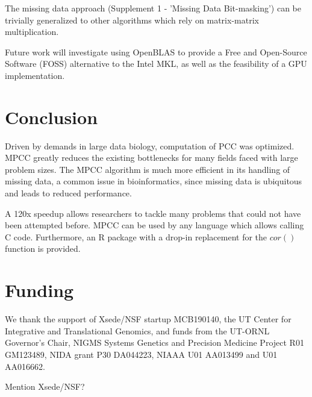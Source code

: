 \documentclass{bioinfo}
\begin{document}
The missing data approach (Supplement 1 - 'Missing Data Bit-masking')
can be trivially generalized to other algorithms which rely on
matrix-matrix multiplication.

Future work will investigate using OpenBLAS to provide a Free and
Open-Source Software (FOSS) alternative to the Intel\textregistered{}
MKL, as well as the feasibility of a GPU implementation.
\vspace*{-5mm}

\section{Conclusion}

Driven by demands in large data biology, computation of PCC was
optimized.  MPCC greatly reduces the existing bottlenecks for many
fields faced with large problem sizes. The MPCC algorithm is much more
efficient in its handling of missing data, a common issue in
bioinformatics, since missing data is ubiquitous and leads to reduced
performance.

A 120x speedup allows researchers to tackle many problems that could
not have been attempted before. MPCC can be used by any language which
allows calling C code. Furthermore, an R package with a drop-in
replacement for the $cor()$ function is provided.

\vspace*{-5mm}
\section*{Funding}

We thank the support of Xsede/NSF startup MCB190140, the UT Center for
Integrative and Translational Genomics, and funds from the UT-ORNL
Governor's Chair, NIGMS Systems Genetics and Precision Medicine
Project R01 GM123489, NIDA grant P30 DA044223, NIAAA U01 AA013499 and
U01 AA016662.

Mention Xsede/NSF?

\vspace*{-5mm}


\end{document}
